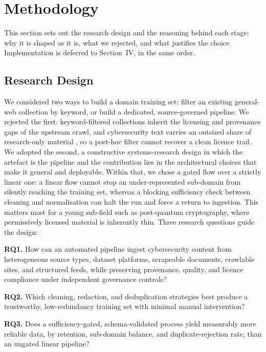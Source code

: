 \documentclass[conference]{IEEEtran}
\begin{document}
\section{Methodology}

This section sets out the research design and the reasoning behind each
stage: why it is shaped as it is, what we rejected, and what justifies
the choice. Implementation is deferred to Section~IV, in the same order.

\subsection{Research Design}

We considered two ways to build a domain training set: filter an
existing general-web collection by keyword, or build a dedicated,
source-governed pipeline. We rejected the first: keyword-filtered
collections inherit the licensing and provenance gaps of the upstream
crawl, and cybersecurity text carries an outsized share of
research-only material \cite{yu2025primus}, so a post-hoc filter cannot
recover a clean licence trail. We adopted the second, a constructive
systems-research design \cite{penedo2023refinedweb} in which the
artefact is the pipeline and the contribution lies in the architectural
choices that make it general and deployable. Within that, we chose a
gated flow over a strictly linear one: a linear flow cannot stop an
under-represented sub-domain from silently reaching the training set,
whereas a blocking sufficiency check between cleaning and normalisation
can halt the run and force a return to ingestion. This matters most for
a young sub-field such as post-quantum cryptography, where permissively
licensed material is inherently thin. Three research questions guide the
design:

\textbf{RQ1.} How can an automated pipeline ingest cybersecurity
content from heterogeneous source types, dataset platforms,
scrapeable documents, crawlable sites, and structured feeds, while
preserving provenance, quality, and licence compliance under
independent governance controls?

\textbf{RQ2.} Which cleaning, redaction, and deduplication strategies
best produce a trustworthy, low-redundancy training set with minimal
manual intervention?

\textbf{RQ3.} Does a sufficiency-gated, schema-validated process yield
measurably more reliable data, by retention, sub-domain balance, and
duplicate-rejection rate, than an ungated linear pipeline?
\end{document}

